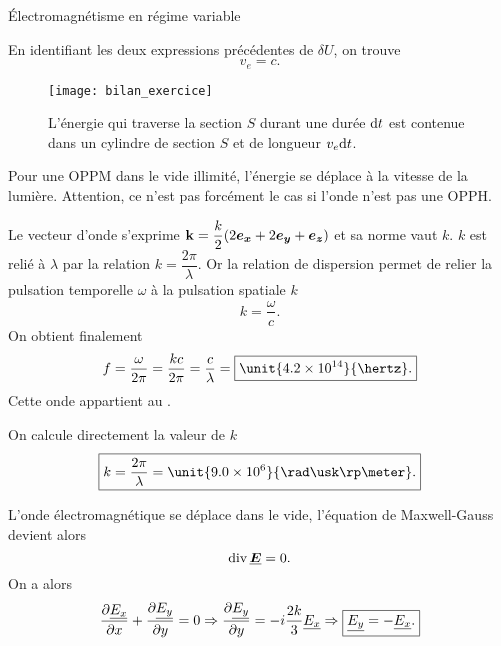 \begin{corr}{Électromagnétisme en régime variable}
\begin{corrlist}
\begin{corrlist}
			  En identifiant les deux expressions précédentes de 
			  $\delta U$, on trouve 
			  \begin{equation*}
				  \boxed{
				  v_e = c.
			  }
			  \end{equation*}
	     \end{corrlist}
	\end{corrlist}
	\begin{figure}[htpb]
		\centering
		\texttt{[image: bilan\_exercice]}
		\caption{L'énergie qui traverse la section $S$ durant une durée
		$\mathrm{d}t$ est contenue dans un cylindre de section $S$ et de 
		longueur $v_e \mathrm{d}t$.}%
		\label{fig:maxwell_bilan_ex}
	\end{figure}
	\begin{defn}
		Pour une OPPM dans le vide illimité, l'énergie se déplace 
		à la vitesse de la lumière. Attention, ce n'est pas forcément le
		cas si l'onde n'est pas une OPPH.
	\end{defn}


\begin{corrlist}
	\item Le vecteur d'onde s'exprime $\mathbf{k} = \dfrac{k}{2}
		(2 \ex + 2\ey + \ez)$ et sa norme vaut $k$. $k$ est relié à 
	      $\lambda$ par la relation $k = \dfrac{2 \pi}{\lambda}$. Or la relation 
	      de dispersion permet de relier la pulsation temporelle $\omega$
	      à la pulsation spatiale $k$ 
	      \begin{equation*}
		      k = \dfrac{\omega}{c}.
	      \end{equation*}
	      On obtient finalement
	      \begin{equation*}
		      f = \dfrac{\omega}{2 \pi} = \dfrac{k c}{2 \pi} 
		      = \dfrac{c}{\lambda} = \boxed{\unit{4.2 \times 10^{14}}{\hertz}.}
	      \end{equation*}
	      Cette onde appartient au .
	\item On calcule directement la valeur de $k$ 
	      \begin{equation*}
		      \boxed{
		      k = \dfrac{2 \pi}{\lambda} = \unit{9.0 \times 10^6}{\rad 
		      \usk \rp \meter}.
	      }
      	      \end{equation*}
	\item L'onde électromagnétique se déplace dans le vide, l'équation de 
	     Maxwell-Gauss devient alors
	     \begin{equation*}
		     \div \complex{\vece} = 0.
	     \end{equation*}
	     On a alors
	     \begin{equation*}
		     \dfrac{\partial \underline{E_x}}{\partial x} + \dfrac{\partial \underline{E_y}}{\partial y} = 0 \Rightarrow 
		     \dfrac{\partial \underline{E_y}}{\partial y} = -i \dfrac{2 k}{3} \underline{E_x}
		     \Rightarrow \boxed{\underline{E_y} = -\underline{E_x}.}
	    \end{equation*}


\end{corrlist}
\end{corr}
